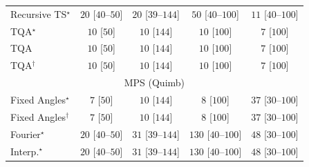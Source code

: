\begin{tabular}{l|cccc|}
Recursive TS$^\star$ & {\cellcolor[HTML]{F5FBF2}} \color[HTML]{000000} $20$ [$40$--$50$] & {\cellcolor[HTML]{F5FBF2}} \color[HTML]{000000} $20$ [$39$--$144$] & {\cellcolor[HTML]{F0F9EC}} \color[HTML]{000000} $50$ [$40$--$100$] & {\cellcolor[HTML]{F6FCF4}} \color[HTML]{000000} $11$ [$40$--$100$] \\
TQA$^\star$ & {\cellcolor[HTML]{F7FCF5}} \color[HTML]{000000} $10$ [$50$] & {\cellcolor[HTML]{F7FCF5}} \color[HTML]{000000} $10$ [$144$] & {\cellcolor[HTML]{F7FCF5}} \color[HTML]{000000} $10$ [$100$] & {\cellcolor[HTML]{F7FCF5}} \color[HTML]{000000} $7$ [$100$] \\
TQA & {\cellcolor[HTML]{F7FCF5}} \color[HTML]{000000} $10$ [$50$] & {\cellcolor[HTML]{F7FCF5}} \color[HTML]{000000} $10$ [$144$] & {\cellcolor[HTML]{F7FCF5}} \color[HTML]{000000} $10$ [$100$] & {\cellcolor[HTML]{F7FCF5}} \color[HTML]{000000} $7$ [$100$] \\
TQA$^\dagger$ & {\cellcolor[HTML]{F7FCF5}} \color[HTML]{000000} $10$ [$50$] & {\cellcolor[HTML]{F7FCF5}} \color[HTML]{000000} $10$ [$144$] & {\cellcolor[HTML]{F7FCF5}} \color[HTML]{000000} $10$ [$100$] & {\cellcolor[HTML]{F7FCF5}} \color[HTML]{000000} $7$ [$100$] \\
\cline{1-5}
\multicolumn{5}{c}{\rule{0pt}{8pt}MPS (Quimb)} \\
\midrule
Fixed Angles$^\star$ & {\cellcolor[HTML]{F7FCF5}} \color[HTML]{000000} $7$ [$50$] & {\cellcolor[HTML]{F7FCF5}} \color[HTML]{000000} $10$ [$144$] & {\cellcolor[HTML]{F7FCF5}} \color[HTML]{000000} $8$ [$100$] & {\cellcolor[HTML]{F2FAEF}} \color[HTML]{000000} $37$ [$30$--$100$] \\
Fixed Angles$^\dagger$ & {\cellcolor[HTML]{F7FCF5}} \color[HTML]{000000} $7$ [$50$] & {\cellcolor[HTML]{F7FCF5}} \color[HTML]{000000} $10$ [$144$] & {\cellcolor[HTML]{F7FCF5}} \color[HTML]{000000} $8$ [$100$] & {\cellcolor[HTML]{F2FAEF}} \color[HTML]{000000} $37$ [$30$--$100$] \\
Fourier$^\star$ & {\cellcolor[HTML]{F5FBF2}} \color[HTML]{000000} $20$ [$40$--$50$] & {\cellcolor[HTML]{F3FAF0}} \color[HTML]{000000} $31$ [$39$--$144$] & {\cellcolor[HTML]{DFF3DA}} \color[HTML]{000000} $130$ [$40$--$100$] & {\cellcolor[HTML]{F0F9ED}} \color[HTML]{000000} $48$ [$30$--$100$] \\
Interp.$^\star$ & {\cellcolor[HTML]{F5FBF2}} \color[HTML]{000000} $20$ [$40$--$50$] & {\cellcolor[HTML]{F3FAF0}} \color[HTML]{000000} $31$ [$39$--$144$] & {\cellcolor[HTML]{DFF3DA}} \color[HTML]{000000} $130$ [$40$--$100$] & {\cellcolor[HTML]{F0F9ED}} \color[HTML]{000000} $48$ [$30$--$100$] \\

\end{tabular}

